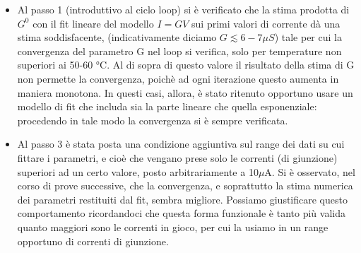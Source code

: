 \documentclass[10pt,letterpaper]{article}
\begin{document}
\begin{itemize}

\item Al passo 1 (introduttivo al ciclo loop) si è verificato che la stima prodotta di $G^0$ con il fit lineare del modello $I = GV$ sui primi valori di corrente dà una stima soddisfacente, (indicativamente diciamo $G \lesssim 6-7 \mu S$) tale per cui la convergenza del parametro G nel loop si verifica, solo per temperature non superiori ai 50-60 °C. Al di sopra di questo valore il risultato della stima di G non permette la convergenza, poichè ad ogni iterazione questo aumenta in maniera monotona. In questi casi, allora, è stato ritenuto opportuno usare un modello di fit che includa sia la parte lineare che quella esponenziale: procedendo in tale modo la convergenza si è sempre verificata.


\item Al passo 3 è stata posta una condizione aggiuntiva sul range dei dati su cui fittare i parametri, e cioè che vengano prese solo le correnti (di giunzione) superiori ad un certo valore, posto arbitrariamente a 10$\mu$A. Si è osservato, nel corso di prove successive, che la convergenza, e soprattutto la stima numerica dei parametri restituiti dal fit, sembra migliore. Possiamo giustificare questo comportamento ricordandoci che questa forma funzionale è tanto più valida quanto maggiori sono le correnti in gioco, per cui la usiamo in un range opportuno di correnti di giunzione.\\

\end{itemize}
\end{document}

